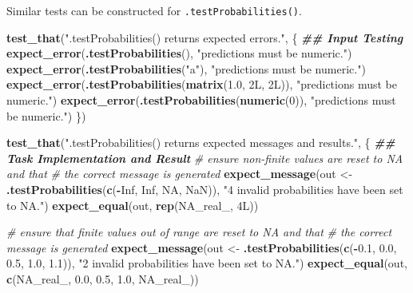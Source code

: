 \documentclass[
]{book}
\newenvironment{Shaded}{\begin{snugshade}}{\end{snugshade}}
\newcommand{\CommentTok}[1]{\textcolor[rgb]{0.56,0.35,0.01}{\textit{#1}}}
\newcommand{\ConstantTok}[1]{\textcolor[rgb]{0.56,0.35,0.01}{#1}}
\newcommand{\DecValTok}[1]{\textcolor[rgb]{0.00,0.00,0.81}{#1}}
\newcommand{\DocumentationTok}[1]{\textcolor[rgb]{0.56,0.35,0.01}{\textbf{\textit{#1}}}}
\newcommand{\FloatTok}[1]{\textcolor[rgb]{0.00,0.00,0.81}{#1}}
\newcommand{\FunctionTok}[1]{\textcolor[rgb]{0.13,0.29,0.53}{\textbf{#1}}}
\newcommand{\NormalTok}[1]{#1}
\newcommand{\OtherTok}[1]{\textcolor[rgb]{0.56,0.35,0.01}{#1}}
\newcommand{\SpecialCharTok}[1]{\textcolor[rgb]{0.81,0.36,0.00}{\textbf{#1}}}
\newcommand{\StringTok}[1]{\textcolor[rgb]{0.31,0.60,0.02}{#1}}
\begin{document}
Similar tests can be constructed for \texttt{.testProbabilities()}.

\begin{Shaded}
\begin{Highlighting}[]
\FunctionTok{test\_that}\NormalTok{(}\StringTok{"\textasciigrave{}.testProbabilities()\textasciigrave{} returns expected errors."}\NormalTok{, \{}
  \DocumentationTok{\#\# Input Testing}
  \FunctionTok{expect\_error}\NormalTok{(}\FunctionTok{.testProbabilities}\NormalTok{(), }\StringTok{"\textasciigrave{}predictions\textasciigrave{} must be numeric."}\NormalTok{)}
  \FunctionTok{expect\_error}\NormalTok{(}\FunctionTok{.testProbabilities}\NormalTok{(}\StringTok{"a"}\NormalTok{), }\StringTok{"\textasciigrave{}predictions\textasciigrave{} must be numeric."}\NormalTok{)}
  \FunctionTok{expect\_error}\NormalTok{(}\FunctionTok{.testProbabilities}\NormalTok{(}\FunctionTok{matrix}\NormalTok{(}\FloatTok{1.0}\NormalTok{, 2L, 2L)), }
               \StringTok{"\textasciigrave{}predictions\textasciigrave{} must be numeric."}\NormalTok{)}
  \FunctionTok{expect\_error}\NormalTok{(}\FunctionTok{.testProbabilities}\NormalTok{(}\FunctionTok{numeric}\NormalTok{(}\DecValTok{0}\NormalTok{)), }
               \StringTok{"\textasciigrave{}predictions\textasciigrave{} must be numeric."}\NormalTok{)}
\NormalTok{\})}

\FunctionTok{test\_that}\NormalTok{(}\StringTok{"\textasciigrave{}.testProbabilities()\textasciigrave{} returns expected messages and results."}\NormalTok{, \{}
  \DocumentationTok{\#\# Task Implementation and Result}
  \CommentTok{\# ensure non{-}finite values are reset to NA and that}
  \CommentTok{\# the correct message is generated}
  \FunctionTok{expect\_message}\NormalTok{(out }\OtherTok{\textless{}{-}} \FunctionTok{.testProbabilities}\NormalTok{(}\FunctionTok{c}\NormalTok{(}\SpecialCharTok{{-}}\ConstantTok{Inf}\NormalTok{, }\ConstantTok{Inf}\NormalTok{, }\ConstantTok{NA}\NormalTok{, }\ConstantTok{NaN}\NormalTok{)),}
                 \StringTok{"4 invalid probabilities have been set to NA."}\NormalTok{)}
  \FunctionTok{expect\_equal}\NormalTok{(out, }\FunctionTok{rep}\NormalTok{(}\ConstantTok{NA\_real\_}\NormalTok{, 4L))}
  
  \CommentTok{\# ensure that finite values out of range are reset to NA and that}
  \CommentTok{\# the correct message is generated}
  \FunctionTok{expect\_message}\NormalTok{(out }\OtherTok{\textless{}{-}} \FunctionTok{.testProbabilities}\NormalTok{(}\FunctionTok{c}\NormalTok{(}\SpecialCharTok{{-}}\FloatTok{0.1}\NormalTok{, }\FloatTok{0.0}\NormalTok{, }\FloatTok{0.5}\NormalTok{, }\FloatTok{1.0}\NormalTok{, }\FloatTok{1.1}\NormalTok{)),}
                 \StringTok{"2 invalid probabilities have been set to NA."}\NormalTok{)}
  \FunctionTok{expect\_equal}\NormalTok{(out, }\FunctionTok{c}\NormalTok{(}\ConstantTok{NA\_real\_}\NormalTok{, }\FloatTok{0.0}\NormalTok{, }\FloatTok{0.5}\NormalTok{, }\FloatTok{1.0}\NormalTok{, }\ConstantTok{NA\_real\_}\NormalTok{))}
  

\end{Highlighting}
\end{Shaded}
\end{document}
